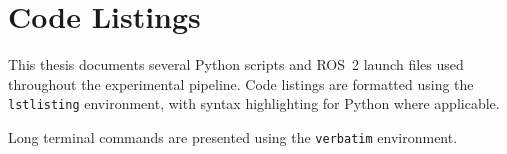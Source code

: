 \section{Code Listings}

This thesis documents several Python scripts and ROS~2 launch files used
throughout the experimental pipeline. Code listings are formatted using the
\texttt{lstlisting} environment, with syntax highlighting for Python where applicable.

Long terminal commands are presented using the \texttt{verbatim} environment.
